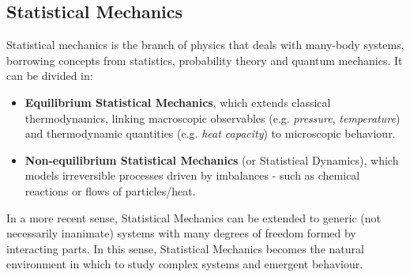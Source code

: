 \documentclass[../../main.tex]{subfiles}
\begin{document}
\subsection{Statistical Mechanics}
Statistical mechanics is the branch of physics that deals with many-body systems, borrowing concepts from statistics, probability theory and quantum mechanics. It can be divided in:
\begin{itemize}
    \item \textbf{Equilibrium Statistical Mechanics}, which extends classical thermodynamics, linking macroscopic observables (e.g. \textit{pressure}, \textit{temperature}) and thermodynamic quantities (e.g. \textit{heat capacity}) to microscopic behaviour. 
    \item \textbf{Non-equilibrium Statistical Mechanics} (or Statistical Dynamics), which models irreversible processes driven by imbalances - such as chemical reactions or flows of particles/heat. 
\end{itemize}
In a more recent sense, Statistical Mechanics can be extended to generic (not necessarily inanimate) systems with many degrees of freedom formed by interacting parts. In this sense, Statistical Mechanics becomes the natural environment in which to study complex systems and emergent behaviour.
\end{document}
